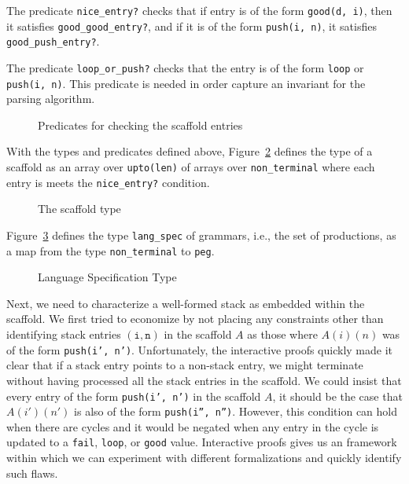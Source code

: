 \documentclass[sigplan,10pt,anonymous,review]{acmart}\settopmatter{printfolios=true,printccs=false,printacmref=false}
\begin{document}
\begin{CCSXML}
The predicate \texttt{nice\_entry?}
checks that if entry is of the form
\texttt{good(d, i)}, then it satisfies \texttt{good\_good\_entry?}, 
and if it is of the form \texttt{push(i, n)}, it satisfies \texttt{good\_push\_entry?}.

The predicate \texttt{loop\_or\_push?} checks that the entry is of the form
\texttt{loop} or \texttt{push(i, n)}\@.  This predicate is needed 
in order capture an invariant for the parsing algorithm.

\begin{figure}[h!]
  
    \vspace*{-4mm}
			\caption{\small Predicates for checking the scaffold entries}
			\label{pvs:checkentry}
\end{figure}



With the types and predicates defined above, Figure~\ref{pvs:scaffold}
defines the type of a
scaffold as an array over \texttt{upto(len)} of arrays over \texttt{non\_terminal}
where each entry is meets the \texttt{nice\_entry?} condition\@.  
\begin{figure}[h!]
  
    \vspace*{-4mm}
			\caption{\small The scaffold type}
			\label{pvs:scaffold}
\end{figure}

Figure~\ref{pvs:grammar} defines the type \texttt{lang\_spec} of grammars, i.e., the set of productions, as 
 a map from the type \texttt{non\_terminal} to \texttt{peg}\@.  
\begin{figure}[h!]
  
    \vspace*{-4mm}
\caption{\small Language Specification Type}
\label{pvs:grammar}
\end{figure}

Next, we need to characterize a well-formed stack as embedded within the scaffold.
 We first tried to economize by not placing any
constraints other than identifying stack entries $(\mathtt{i, n})$ in the
scaffold $A$ as those where $A(i)(n)$ was of the form \texttt{push(i',
  n')}\@.  Unfortunately, the interactive proofs quickly made it clear
that if a stack entry points
to a non-stack entry, we might terminate without having processed
all the stack entries in the  scaffold. 
  We could insist that every entry of the form
\texttt{push(i', n')} in the scaffold $A$, it should be the case that
$A(i')(n')$ is also of the form \texttt{push(i'', n'')}.  However,
this condition can hold when there are cycles and it would be negated
when any entry in the cycle is updated to a \texttt{fail},
\texttt{loop}, or \texttt{good} value.  Interactive proofs gives
us an framework within which we can experiment with different formalizations
and quickly identify such flaws.  


\end{CCSXML}
\end{document}

